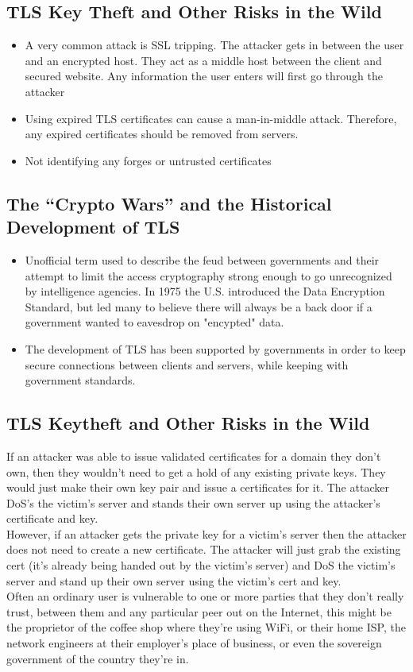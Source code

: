 \documentclass[11pt]{article} %
\begin{document}
{\subsection{TLS Key Theft and Other Risks in the Wild}
\begin{itemize}
  \item A very common attack is SSL tripping. The attacker gets in between the user and an encrypted host. They act as a middle host between the client and secured website. Any information the user enters will first go through the attacker
  \item Using expired TLS certificates can cause a man-in-middle attack. Therefore, any expired certificates should be removed from servers.
 \item Not identifying any forges or untrusted certificates
\end{itemize}

\subsection{The “Crypto Wars” and the Historical Development of TLS}
\begin{itemize}
  \item Unofficial term used to describe the feud between governments and their attempt to limit the access cryptography strong enough to go unrecognized by intelligence agencies. In 1975 the U.S. introduced the Data Encryption Standard, but led many to believe there will always be a back door if a government wanted to eavesdrop on "encypted" data.
  \item The development of TLS has been supported by governments in order to keep secure connections between clients and servers, while keeping with government standards.
\end{itemize}

\subsection{TLS Keytheft and Other Risks in the Wild}
If an attacker was able to issue validated certificates for a domain they don’t own, then they wouldn’t need to get a hold of any existing private keys. They would just make their own key pair and issue a certificates for it. The attacker DoS’s the victim’s server and stands their own server up using the attacker’s certificate and key.
\\
However, if an attacker gets the private key for a victim’s server then the attacker does not need to create a new certificate. The attacker will just grab the existing cert (it’s already being handed out by the victim’s server) and DoS the victim’s server and stand up their own server using the victim’s cert and key.
\\
Often an ordinary user is vulnerable to one or more parties that they don't really trust, between them and any particular peer out on the Internet, this might be the proprietor of the coffee shop where they're using WiFi, or their home ISP, the network engineers at their employer's place of business, or even the sovereign government of the country they're in.

}
\end{document}
